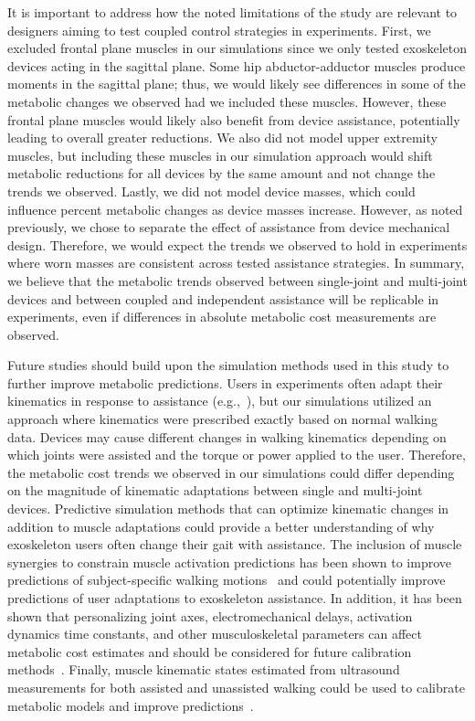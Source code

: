 \documentclass[10pt,letterpaper]{article}
\begin{document}
It is important to address how the noted limitations of the study are relevant to designers aiming to test coupled control strategies in experiments. First, we excluded frontal plane muscles in our simulations since we only tested exoskeleton devices acting in the sagittal plane. Some hip abductor-adductor muscles produce moments in the sagittal plane; thus, we would likely see differences in some of the metabolic changes we observed had we included these muscles. However, these frontal plane muscles would likely also benefit from device assistance, potentially leading to overall greater reductions. We also did not model upper extremity muscles, but including these muscles in our simulation approach would shift metabolic reductions for all devices by the same amount and not change the trends we observed. Lastly, we did not model device masses, which could influence percent metabolic changes as device masses increase. However, as noted previously, we chose to separate the effect of assistance from device mechanical design. Therefore, we would expect the trends we observed to hold in experiments where worn masses are consistent across tested assistance strategies. In summary, we believe that the metabolic trends observed between single-joint and multi-joint devices and between coupled and independent assistance will be replicable in experiments, even if differences in absolute metabolic cost measurements are observed.  

Future studies should build upon the simulation methods used in this study to further improve metabolic predictions. Users in experiments often adapt their kinematics in response to assistance (e.g.,~\cite{Gordon:2018, Collins:2015, Quinlivan:2017, Lee:2017, Panizzolo:2016, Jackson:2015, Galle:2017, Koller:2015}), but our simulations utilized an approach where kinematics were prescribed exactly based on normal walking data. Devices may cause different changes in walking kinematics depending on which joints were assisted and the torque or power applied to the user. Therefore, the metabolic cost trends we observed in our simulations could differ depending on the magnitude of kinematic adaptations between single and multi-joint devices. Predictive simulation methods that can optimize kinematic changes in addition to muscle adaptations could provide a better understanding of why exoskeleton users often change their gait with assistance. The inclusion of muscle synergies to constrain muscle activation predictions has been shown to improve predictions of subject-specific walking motions~\cite{Meyer:2016} and could potentially improve predictions of user adaptations to exoskeleton assistance. In addition, it has been shown that personalizing joint axes, electromechanical delays, activation dynamics time constants, and other musculoskeletal parameters can affect metabolic cost estimates and should be considered for future calibration methods~\cite{Arones:2020}. Finally, muscle kinematic states estimated from ultrasound measurements for both assisted and unassisted walking could be used to calibrate metabolic models and improve predictions~\cite{Nuckols:2020}. 
\end{document}
